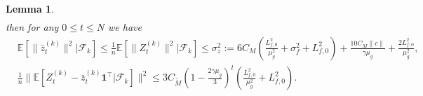 \documentclass{article}
\theoremstyle{plain}
\newtheorem{lemma}[theorem]{Lemma}
\theoremstyle{definition}
\theoremstyle{remark}
\newcommand{\E}{\mathbb{E}}
\newcommand{\F}{\mathcal{F}}
\newcommand{\bfonet}{\mathbf{1}^{\top}}
\begin{document}
\begin{lemma}
\begin{equation}
\begin{aligned}
        \end{aligned}
    \end{equation}
    then for any $0\leq t\leq N$ we have
    \begin{align}
        &\E\left[\|\bar{z}_t^{(k)}\|^2|\F_k\right]\leq\frac{1}{n}\E\left[\|Z_t^{(k)}\|^2|\F_k\right]\leq \sigma_z^2 := 6C_M\left(\frac{L_{f,0}^2}{\mu_g^2} + \sigma_{f}^2 + L_{f,0}^2\right) + \frac{10C_M\|c\|}{\gamma\mu_g} + \frac{2L_{f,0}^2}{\mu_g^2}, \label{ineq: z_bdd_2_m} \\
        &\frac{1}{n}\|\E\left[Z_{t}^{(k)} - \bar{z}_{t}^{(k)}\bfonet|\F_k\right]\|^2\leq 3C_{\tilde{M}}\left(1-\frac{2\gamma\mu_g}{3}\right)^t\left(\frac{L_{f,0}^2}{\mu_g^2} + L_{f,0}^2\right). \label{ineq: z_exp_cons}
    \end{align}
\end{lemma}
\end{document}
